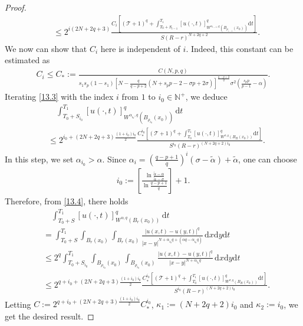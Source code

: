 \documentclass[reqno,10pt]{amsart}
\numberwithin{equation}{section}
\begin{document}
\begin{proof}
\begin{align}
		&\le2^{i(2N+2q+3)}\frac{C_i\left[\left(\mathcal{T}+1\right)^q+\int_{T_0+S_{i-1}}^{T_1}[u(\cdot,t)]^q_{W^{\alpha_{i-1},q}\left( B_{\rho_{i-1}}(x_0)\right)}\mathrm{d}t\right]}{S(R-r)^{N+2q+2}}.
	\end{align}
	We now can show that $C_i$ here is independent of $i$. Indeed, this constant can be estimated as
	\begin{align*}
		C_i\le C_*:=\frac{C(N,p,q)}{s_1s_p(1-s_1)\left[ N-\frac{q}{q-p+2}(N+s_pp-2-\sigma p+2\sigma)\right]^\frac{q-p+2}{q}\sigma^2\left(\frac{s_pp}{p-1}-\alpha\right) }.
	\end{align*}
	Iterating \eqref{13.3} with the index $i$ from $1$ to $i_0\in\mathbb{N}^+$, we deduce
	\begin{align}
		\label{13.4}
		&\quad\int_{T_0+S_{i_0}}^{T_1}[u(\cdot,t)]^q_{W^{\alpha_{i_0},q}(B_{\rho_{i_0}}(x_0))}\,\mathrm{d}t\nonumber\\
		&\le2^{i_0+(2N+2q+3)\frac{(1+i_0)i_0}{2} }\frac{C_{*}^{i_0}\left[\left(\mathcal{T}+1\right)^q+\int_{T_0}^{T_1}[u(\cdot,t)]^q_{W^{\sigma,q}\left( B_{R}(x_0)\right)}\mathrm{d}t\right]}{S^{i_0}(R-r)^{(N+2q+2)i_0}}.
	\end{align}
	In this step, we set $\alpha_{i_0}>\alpha$. Since $\alpha_i=\left(\frac{q-p+1}{q}\right)^i\left( \sigma-\tilde{\alpha}\right)+\tilde{\alpha}$, one can choose
	\begin{align*}
		i_0:=\left[\frac{\ln \frac{\tilde{\alpha}-\alpha}{\tilde{\alpha}-\sigma}}{\ln\frac{q-p+1}{q}}\right]+1. 
	\end{align*}
	Therefore, from \eqref{13.4}, there holds
	\begin{align}
		\label{13.5}
		&\quad\int_{T_0+S}^{T_1}[u(\cdot,t)]^q_{W^{\alpha,q}(B_{r}(x_0))}\,\mathrm{d}t\nonumber\\
		&=\int_{T_0+S}^{T_1}\int_{B_{r}(x_0)}\int_{B_{r}(x_0)}\frac{|u(x,t)-u(y,t)|^q}{|x-y|^{N+\alpha_{i_0}q+(\alpha q-\alpha_{i_0}q)}}\,\mathrm{d}x\mathrm{d}y\mathrm{d}t\nonumber\\
		&\le2^q \int_{T_0+S_{i_0}}^{T_1}\int_{B_{\rho_{i_0}}(x_0)}\int_{B_{\rho_{i_0}}(x_0)}\frac{|u(x,t)-u(y,t)|^q}{|x-y|^{N+\alpha_{i_0}q}}\,\mathrm{d}x\mathrm{d}y\mathrm{d}t\nonumber\\
		&\le2^{q+i_0+(2N+2q+3)\frac{(1+i_0)i_0}{2} }\frac{C_{*}^{i_0}\left[\left(\mathcal{T}+1\right)^q+\int_{T_0}^{T_1}[u(\cdot,t)]^q_{W^{\sigma,q}\left( B_{R}(x_0)\right)}\mathrm{d}t\right]}{S^{i_0}(R-r)^{(N+2q+2)i_0}}.
	\end{align}
	Letting $C:=2^{q+i_0+(2N+2q+3)\frac{(1+i_0)i_0}{2} }C_{*}^{i_0}$, $\kappa_1:=(N+2q+2)i_0$ and $\kappa_2:=i_0$, we get the desired result.
	

\end{proof}
\end{document}
